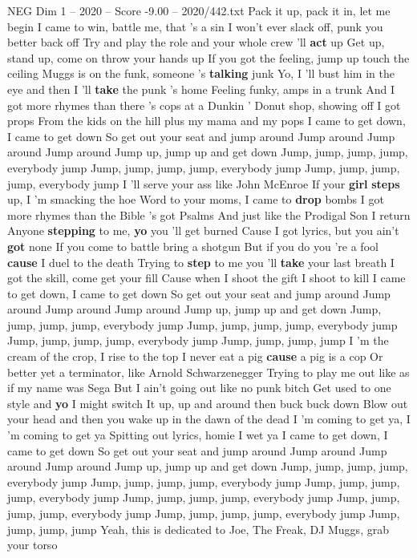 \begin{textsample}{NEG Dim 1 – 2020 – Score -9.00 – 2020/442.txt}  \label{ex:f1_neg_033}
Pack it up, pack it in, let me begin I came to win, battle me, that 's a sin I won't ever slack off, punk you better back off Try and play the role and your whole crew 'll \textbf{act} up Get up, stand up, come on throw your hands up If you got the feeling, jump up touch the ceiling Muggs is on the funk, someone 's \textbf{talking} junk Yo, I 'll bust him in the eye and then I 'll \textbf{take} the punk 's home Feeling funky, amps in a trunk And I got more rhymes than there 's cops at a Dunkin ' Donut shop, showing off I got props From the kids on the hill plus my mama and my pops I came to get down, I came to get down So get out your seat and jump around Jump around Jump around Jump around Jump up, jump up and get down Jump, jump, jump, jump, everybody jump Jump, jump, jump, jump, everybody jump Jump, jump, jump, jump, everybody jump I 'll serve your ass like John McEnroe If your \textbf{girl} \textbf{steps} up, I 'm smacking the hoe Word to your moms, I came to \textbf{drop} bombs I got more rhymes than the Bible 's got Psalms And just like the Prodigal Son I return Anyone \textbf{stepping} to me, \textbf{yo} you 'll get burned Cause I got lyrics, but you ain't \textbf{got} none If you come to battle bring a shotgun But if you do you 're a fool \textbf{cause} I duel to the death Trying to \textbf{step} to me you 'll \textbf{take} your last breath I got the skill, come get your fill Cause when I shoot the gift I shoot to kill I came to get down, I came to get down So get out your seat and jump around Jump around Jump around Jump around Jump up, jump up and get down Jump, jump, jump, jump, everybody jump Jump, jump, jump, jump, everybody jump Jump, jump, jump, jump, everybody jump Jump, jump, jump, jump I 'm the cream of the crop, I rise to the top I never eat a pig \textbf{cause} a pig is a cop Or better yet a terminator, like Arnold Schwarzenegger Trying to play me out like as if my name was Sega But I ain't going out like no punk bitch Get used to one style and \textbf{yo} I might switch It up, up and around then buck buck down Blow out your head and then you wake up in the dawn of the dead I 'm coming to get ya, I 'm coming to get ya Spitting out lyrics, homie I wet ya I came to get down, I came to get down So get out your seat and jump around Jump around Jump around Jump around Jump up, jump up and get down Jump, jump, jump, jump, everybody jump Jump, jump, jump, jump, everybody jump Jump, jump, jump, jump, everybody jump Jump, jump, jump, jump, everybody jump Jump, jump, jump, jump, everybody jump Jump, jump, jump, jump, everybody jump Jump, jump, jump, jump Yeah, this is dedicated to Joe, The Freak, DJ Muggs, grab your torso

\end{textsample}
